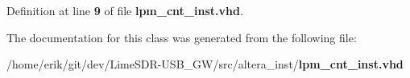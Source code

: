 Definition at line {\bf 9} of file {\bf lpm\+\_\+cnt\+\_\+inst.\+vhd}.



The documentation for this class was generated from the following file\+:\begin{DoxyCompactItemize}
\item 
/home/erik/git/dev/\+Lime\+S\+D\+R-\/\+U\+S\+B\+\_\+\+G\+W/src/altera\+\_\+inst/{\bf lpm\+\_\+cnt\+\_\+inst.\+vhd}\end{DoxyCompactItemize}
